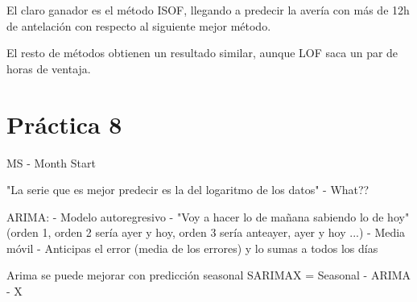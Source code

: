 \documentclass[
12pt, 
spanish, 
singlespacing,
headsepline
]{article}
\begin{document}
El claro ganador es el método ISOF, llegando a predecir la avería con más de 12h de antelación con respecto al siguiente mejor método.

El resto de métodos obtienen un resultado similar, aunque LOF saca un par de horas de ventaja.

\section{Práctica 8}
MS -\> Month Start

"La serie que es mejor predecir es la del logaritmo de los datos" - What??

ARIMA:
- Modelo autoregresivo - "Voy a hacer lo de mañana sabiendo lo de hoy" (orden 1, orden 2 sería ayer y hoy, orden 3 sería anteayer, ayer y hoy ...)
- Media móvil - Anticipas el error (media de los errores) y lo sumas a todos los días

Arima se puede mejorar con predicción seasonal
SARIMAX = Seasonal - ARIMA - X
\end{document}
